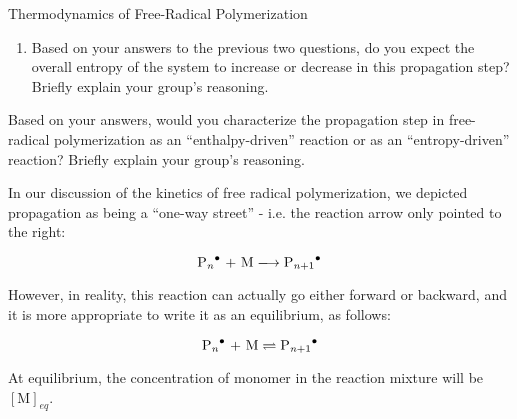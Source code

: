 \begin{activity}{Thermodynamics of Free-Radical Polymerization}
\begin{ctqs}
\begin{enumerate}
				\begin{solution}[0.5in]
				\end{solution}
			
			\item Based on your answers to the previous two questions, do you expect the overall entropy of the system to increase or decrease in this propagation step?  Briefly explain your group's reasoning.
				
				\begin{solution}[1.5in]
				\end{solution}
			
		\end{enumerate}
	
	\question Based on your answers, would you characterize the propagation step in free-radical polymerization as an ``enthalpy-driven'' reaction or as an ``entropy-driven'' reaction?  Briefly explain your group's reasoning.
	
		\begin{solution}[1.5in]
		\end{solution}

\end{ctqs}




\begin{model}
	\label{\labelbase:mdl:propequilib}

	In our discussion of the kinetics of free radical polymerization, we depicted propagation as being a ``one-way street'' - i.e. the reaction arrow only pointed to the right:
	
	\begin{equation*}
		\text{\ce{P_n^.} + M} \xlongrightarrow{} \text{\ce{P_{n+1}^.}}
	\end{equation*}
	
	However, in reality, this reaction can actually go either forward or backward, and it is more appropriate to write it as an equilibrium, as follows:
	
	\begin{equation*}
		\text{\ce{P_n^.} + M} \rightleftharpoons{} \text{\ce{P_{n+1}^.}}
	\end{equation*}
	
	At equilibrium, the concentration of monomer in the reaction mixture will be $[\text{M}]_{eq}$.
	
\end{model}


\begin{ctqs}


\end{ctqs}
\end{activity}
